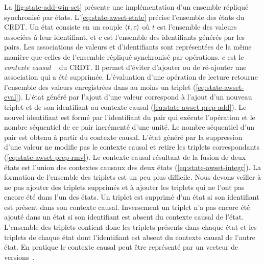 La \autoref{fig:state-add-win-set} présente une implémentation d'un ensemble répliqué synchronisé par états.
L'\autoref{eq:state-awset-state} précise l'ensemble des états du \ac{CRDT}.
Un état consiste en un couple $\tuple*{t,c}$ où $t$ est l'ensemble des valeurs associées à leur identifiant, et $c$ est l'ensemble des identifiants générés par les pairs.
Les associations de valeurs et d'identifiants sont représentées de la même manière que celles de l'ensemble répliqué synchronisé par opérations.
$c$ est le \emph{contexte causal }~\autocite{almeida_2018_delta-crdt-revisited} du \ac{CRDT}.
Il permet d'éviter d'ajouter ou de ré-ajouter une association qui a été supprimée.
L’évaluation d’une opération de lecture retourne l’ensemble des valeurs enregistrées dans au moins un triplet (\autoref{eq:state-awset-eval}).
L'état généré par l'ajout d'une valeur correspond à l'ajout d'un nouveau triplet et de son identifiant au contexte causal (\autoref{eq:state-awset-prep-add}).
Le nouvel identifiant est formé par l'identifiant du pair qui exécute l'opération et le nombre séquentiel de ce pair incrémenté d'une unité.
Le nombre séquentiel d'un pair est obtenu à partir du contexte causal.
L'état généré par la suppression d'une valeur ne modifie pas le contexte causal et retire les triplets correspondants (\autoref{eq:state-awset-prep-rmv}).
Le contexte causal résultant de la fusion de deux états est l'union des contextes causaux des deux états (\autoref{eq:state-awset-integr}).
La formation de l'ensemble des triplets est un peu plus difficile.
Nous devons veiller à ne pas ajouter des triplets supprimés et à ajouter les triplets qui ne l'ont pas encore été dans l'un des états.
Un triplet est supprimé d'un état si son identifiant est présent dans son contexte causal.
Inversement un triplet n'a pas encore été ajouté dans un état si son identifiant est absent du contexte causal de l'état.
L'ensemble des triplets contient donc les triplets présents dans chaque état et les triplets de chaque état dont l'identifiant est absent du contexte causal de l'autre état.
En pratique le contexte causal peut être représenté par un vecteur de versions~\autocite{parker_1983_versionvector,mattern_1988_timevector}.

